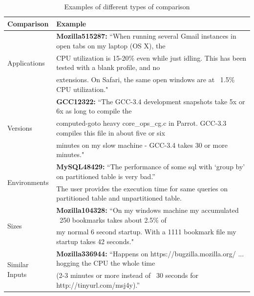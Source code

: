 \begin{table}[tb!]
\small
\centering
{
\begin{tabular}{l|l}
\hline
{\bf Comparison} & {\bf Example}\\
\hline 
\multirow{3}{0.8in}{Applications} & {\bf Mozilla515287:} ``When running several Gmail instances in open tabs on my laptop (OS X), the \\
& CPU utilization is 15-20\% even while just idling. This has been tested with a blank profile, and no \\
& extensions. On Safari, the same open windows are at ~1.5\% CPU utilization."\\
\hline
\multirow{3}{0.8in}{Versions} & {\bf GCC12322:} ``The GCC-3.4 development snapshots take 5x or 6x as long to compile the \\
& computed-goto heavy core\_ops\_cg.c in Parrot. GCC-3.3 compiles this file in about five or six \\
& minutes on my slow  machine - GCC-3.4 takes 30 or more minutes."\\
\hline
\multirow{2}{0.8in}{Environments} & {\bf MySQL48429:} ``The performance of some sql with `group by' on partitioned table is very bad.''\\
&The user provides the execution time for same queries on partitioned table and unpartitioned table. \\
\hline
\multirow{2}{0.8in}{Sizes} & {\bf Mozilla104328:} ``On my windows machine my accumulated ~250 bookmarks takes about 2.5\% of  \\
&my normal 6 second startup. With a 1111 bookmark file my startup takes 42 seconds."\\
\hline
\multirow{2}{0.8in}{Similar Inputs} & {\bf Mozilla336944:} ``Happens on https://bugzilla.mozilla.org/ ... hogging the CPU the whole time\\
& (2-3 minutes or more instead of ~30 seconds for http://tinyurl.com/msj4y).'' \\
\hline
\end{tabular}
\caption{Examples of different types of comparison}
\label{tab:example}
}
\end{table}


